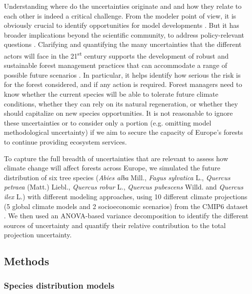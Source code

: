 \documentclass[letterpaper,8pt]{article}  %
\begin{document}
\begin{doublespacing}
\begin{linenumbers}
Understanding where do the uncertainties originate and  and how they relate to each other is indeed a critical challenge. From the modeler point of view, it is obviously crucial to identify opportunities for model developments \citep{Petchey2015}. But it has broader implications beyond the scientific community, to address policy-relevant questions \citep{Urban2016}. Clarifying and quantifying the many uncertainties that the different actors will face in the 21\textsuperscript{st} century supports the development of robust and sustainable forest management practices that can accommodate a range of possible future scenarios \citep{IPCC2021}. In particular, it helps identify how serious the risk is for the forest considered, and if any action is required. Forest managers need to know whether the current species will be able to tolerate future climate conditions, whether they can rely on its natural regeneration, or whether they should capitalize on new species opportunities. It is not reasonable to ignore these uncertainties or to consider only a portion (e.g. omitting model methodological uncertainty) if we aim to secure the capacity of Europe’s forests to continue providing ecosystem services. 

To capture the full breadth of uncertainties that are relevant to assess how climate change will affect forests across Europe,
we simulated the future distribution of six tree species (\emph{Abies alba} Mill., \emph{Fagus sylvatica} L., \emph{Quercus petraea} (Matt.) Liebl., \emph{Quercus robur} L., \emph{Quercus pubescens} Willd. and \emph{Quercus ilex} L.) with different modeling approaches, using 10 different climate projections (5 global climate models and 2 socioeconomic scenarios) from the CMIP6 dataset \citep{Noel2022}. We then used an ANOVA-based variance decomposition to identify the different sources of uncertainty and quantify their relative contribution to the total projection uncertainty.

\clearpage

\subsection{Methods}

\subsubsection{Species distribution models}


\end{linenumbers}
\end{doublespacing}
\end{document}
